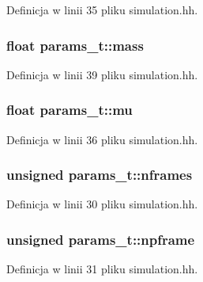 Definicja w linii 35 pliku simulation.\+hh.

\hypertarget{structparams__t_afe4a59fe43565a71a0a7a155714e2af1}{}
\subsubsection[{mass}]{\setlength{\rightskip}{0pt plus 5cm}float params\+\_\+t\+::mass}\label{structparams__t_afe4a59fe43565a71a0a7a155714e2af1}


Definicja w linii 39 pliku simulation.\+hh.

\hypertarget{structparams__t_a971359c29b2f946b477e4a1b3605fa3f}{}
\subsubsection[{mu}]{\setlength{\rightskip}{0pt plus 5cm}float params\+\_\+t\+::mu}\label{structparams__t_a971359c29b2f946b477e4a1b3605fa3f}


Definicja w linii 36 pliku simulation.\+hh.

\hypertarget{structparams__t_a2cecc28f4ca024657cf567047e2aba59}{}
\subsubsection[{nframes}]{\setlength{\rightskip}{0pt plus 5cm}unsigned params\+\_\+t\+::nframes}\label{structparams__t_a2cecc28f4ca024657cf567047e2aba59}


Definicja w linii 30 pliku simulation.\+hh.

\hypertarget{structparams__t_a06a1a567fd5ba13905514227e2bb710a}{}
\subsubsection[{npframe}]{\setlength{\rightskip}{0pt plus 5cm}unsigned params\+\_\+t\+::npframe}\label{structparams__t_a06a1a567fd5ba13905514227e2bb710a}


Definicja w linii 31 pliku simulation.\+hh.

\hypertarget{structparams__t_a2eb309edb681d0a998f23fc692a73781}{}
